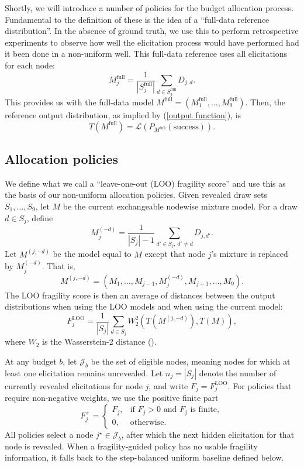 \documentclass[11pt]{article}
\newcommand{\law}{\mathcal{L}}
\newcommand{\wtsq}{W_2^2}
\begin{document}
Shortly, we will introduce a number of policies for the budget allocation process. Fundamental to the definition of these is the idea of a ``full-data reference distribution''. In the absence of ground truth, we use this to perform retrospective experiments to observe how well the elicitation process would have performed had it been done in a non-uniform well. This full-data reference uses all elicitations for each node:
\[
M_j^{\mathrm{full}}
=
\frac{1}{|S_j^{\mathrm{full}}|}
\sum_{d\in S_j^{\mathrm{full}}}D_{j,d}.
\]
This provides us with the full-data model $M^{\mathrm{full}} = (M^{\mathrm{full}}_1,\dots,M^{\mathrm{full}}_9)$.
Then, the reference output distribution, as implied by (\ref{output function}), is
\[
T(M^{\mathrm{full}})=\law\left(P_{M^{\mathrm{full}}}(\mathrm{success})\right).
\]

\subsection{Allocation policies}

We define what we call a ``leave-one-out (LOO) fragility score'' and use this as the basis of our non-uniform allocation policies. Given revealed draw sets $S_1,\ldots,S_9$, let $M$ be the current exchangeable nodewise mixture model. For a draw $d\in S_j$, define
\[
M_j^{(-d)}
=
\frac{1}{|S_j|-1}
\sum_{d'\in S_j,\,d'\neq d}D_{j,d'}.
\]
Let $M^{(j,-d)}$ be the model equal to $M$ except that node $j$'s mixture is replaced by $M_j^{(-d)}$. That is, \[M^{(j,-d)} = (M_1,\dots,M_{j-1},M_j^{(-d)},M_{j+1},\dots,M_9).\]
The LOO fragility score is then an average of distances between the output distributions when using the LOO models and when using the current model:
\[
F_j^{\mathrm{LOO}}
=
\frac{1}{|S_j|}
\sum_{d\in S_j}
\wtsq\left(T(M^{(j,-d)}),T(M)\right),
\]
where $W_2$ is the Wasserstein-2 distance (\cite{villani2009optimal}).

At any budget $b$, let $\mathcal{J}_b$ be the set of eligible nodes, meaning nodes for which at least one elicitation remains unrevealed. Let $n_j = |S_j|$ denote the number of currently revealed elicitations for node $j$, and write $F_j = F_j^{\mathrm{LOO}}$. For policies that require non-negative weights, we use the positive finite part
\[
F_j^+
=
\begin{cases}
F_j, & \text{if } F_j > 0 \text{ and } F_j \text{ is finite},\\
0, & \text{otherwise}.
\end{cases}
\]
All policies select a node $j^\star \in \mathcal{J}_b$, after which the next hidden elicitation for that node is revealed. When a fragility-guided policy has no usable fragility information, it falls back to the step-balanced uniform baseline defined below.
\end{document}
